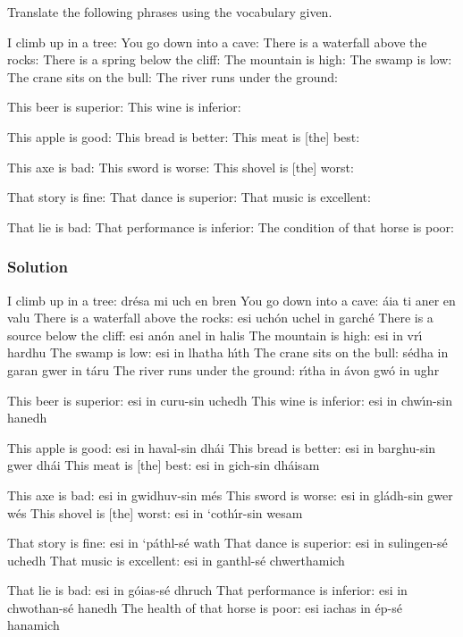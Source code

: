 Translate the following phrases using the vocabulary given.

I climb up in a tree:
You go down into a cave:
There is a waterfall above the rocks:
There is a spring below the cliff:
The mountain is high:
The swamp is low:
The crane sits on the bull:
The river runs under the ground:

This beer is superior:
This wine is inferior:

This apple is good:
This bread is better:
This meat is [the] best:

This axe is bad:
This sword is worse:
This shovel is [the] worst:

That story is fine:
That dance is superior:
That music is excellent:

That lie is bad:
That performance is inferior:
The condition of that horse is poor:

\newpage
\subsubsection{Solution}

I climb up in a tree: dr\'{e}sa mi uch en bren
You go down into a cave: \'{a}ia ti aner en valu
There is a waterfall above the rocks: esi uch\'{o}n uchel in garch\'{e}
There is a source below the cliff: esi an\'{o}n anel in halis
The mountain is high: esi in vr\'{\i} hardhu
The swamp is low: esi in lhatha h\'{\i}th
The crane sits on the bull: s\'{e}dha in garan gwer in t\'{a}ru
The river runs under the ground: r\'{\i}tha in \'{a}von gw\'{o} in ughr

This beer is superior: esi in curu-sin uchedh
This wine is inferior: esi in chw\'{\i}n-sin hanedh

This apple is good: esi in haval-sin dh\'{a}i
This bread is better: esi in barghu-sin gwer dh\'{a}i
This meat is [the] best: esi in gich-sin dh\'{a}isam

This axe is bad: esi in gwidhuv-sin m\'{e}s
This sword is worse: esi in gl\'{a}dh-sin gwer w\'{e}s
This shovel is [the] worst: esi in ‘coth\'{\i}r-sin wesam

That story is fine: esi in ‘p\'{a}thl-s\'{e} wath
That dance is superior: esi in sulingen-s\'{e} uchedh
That music is excellent: esi in ganthl-s\'{e} chwerthamich

That lie is bad: esi in g\'{o}ias-s\'{e} dhruch
That performance is inferior: esi in chwothan-s\'{e} hanedh
The health of that horse is poor: esi iachas in \'{e}p-s\'{e} hanamich
